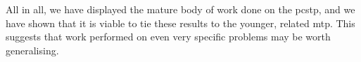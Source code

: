 \medskip
All in all, we have displayed the mature body of work done
on the \acrlong{pcstp},
and we have shown that it is viable to tie these results
to the younger, related \acrlong{mtp}.
This suggests that work performed on even
very specific problems may be worth generalising.




